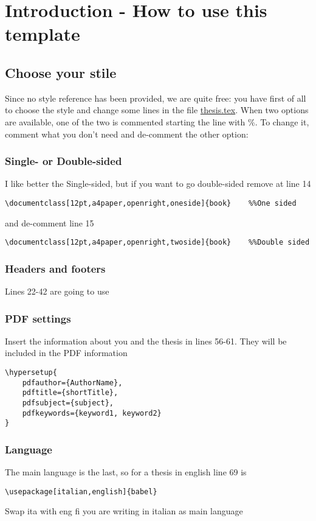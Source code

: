 \chapter{Introduction - How to use this template}

\section{Choose your stile}

Since no style reference has been provided, we are quite free: you have first of all to choose the style and change some lines in the file \url{thesis.tex}. When two options are available, one of the two is commented starting the line with \%. To change it, comment what you don't need and de-comment the other option:

\subsection{Single- or Double-sided}
I like better the Single-sided, but if you want to go double-sided remove at line 14
\begin{verbatim}
\documentclass[12pt,a4paper,openright,oneside]{book}	%%One sided
\end{verbatim}
and de-comment line 15
\begin{verbatim}
\documentclass[12pt,a4paper,openright,twoside]{book}	%%Double sided
\end{verbatim}

\subsection{Headers and footers}
Lines 22-42 are going to use 


\subsection{PDF settings}
Insert the information about you and the thesis in lines 56-61. They will be included in the PDF information
\begin{verbatim}
\hypersetup{
    pdfauthor={AuthorName},
    pdftitle={shortTitle},
    pdfsubject={subject},
    pdfkeywords={keyword1, keyword2}
}
\end{verbatim}

\subsection{Language}
The main language is the last, so for a thesis in english line 69 is
\begin{verbatim}
\usepackage[italian,english]{babel} 
\end{verbatim}
Swap ita with eng fi you are writing in italian as main language





